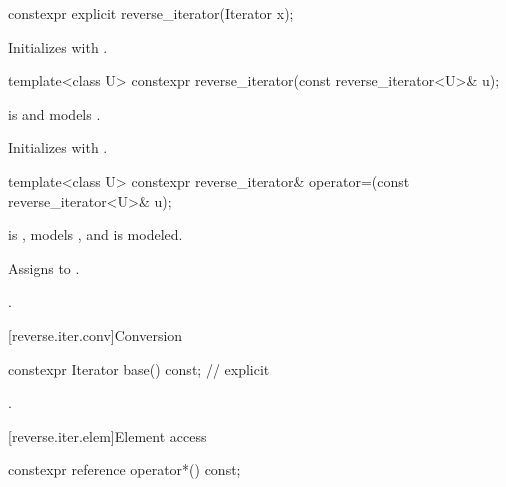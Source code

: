 %
\begin{itemdecl}
constexpr explicit reverse_iterator(Iterator x);
\end{itemdecl}

\begin{itemdescr}
\pnum
\effects
Initializes
with .
\end{itemdescr}

%
\begin{itemdecl}
template<class U> constexpr reverse_iterator(const reverse_iterator<U>& u);
\end{itemdecl}

\begin{itemdescr}
\pnum
\constraints
{} is  and
 models .

\pnum
\effects
Initializes
with
.
\end{itemdescr}

%
\begin{itemdecl}
template<class U>
  constexpr reverse_iterator&
    operator=(const reverse_iterator<U>& u);
\end{itemdecl}

\begin{itemdescr}
\pnum
\constraints
{} is ,
 models , and
 is modeled.

\pnum
\effects
Assigns  to .

\pnum
\returns
{}.
\end{itemdescr}

[reverse.iter.conv]{Conversion}

%
\begin{itemdecl}
constexpr Iterator base() const;          // explicit
\end{itemdecl}

\begin{itemdescr}
\pnum
\returns
{}.
\end{itemdescr}

[reverse.iter.elem]{Element access}

%
\begin{itemdecl}
constexpr reference operator*() const;
\end{itemdecl}

